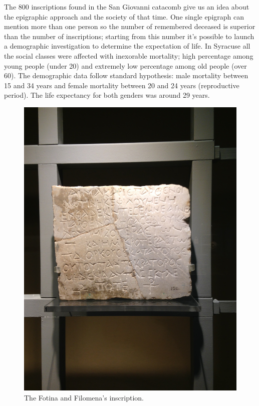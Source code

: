 \documentclass[amsthm,ebook]{saparticle}
\begin{document}
The 800 inscriptions found in the San Giovanni catacomb give us an idea about the epigraphic approach and the society of that time. One single epigraph can mention more than one person so the number of remembered deceased is superior than the number of inscriptions; starting from this number it’s possible to launch a demographic investigation to determine the expectation of life.
In Syracuse all the social classes were affected with inexorable mortality; high percentage among young people (under 20) and extremely low percentage among old people (over 60). The demographic data follow standard hypothesis: male mortality between 15 and 34 years and female mortality between 20 and 24 years (reproductive period). The life expectancy for both genders was around 29 years.

\begin{figure}[hbp]
\centering
 \includegraphics[width=\columnwidth]{FotinaeFilomena.JPG}
\caption{The Fotina and Filomena’s inscription.}
\label{fig:4}
\end{figure}
\end{document}

